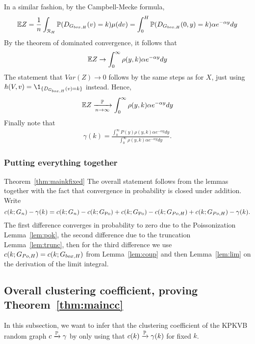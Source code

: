 In a similar fashion, by the Campbell-Mecke formula,
\begin{align*}
\mathbb{E} Z =\frac{1}{n} \int_{{\mathcal R}_H} \mathbb{P}(D_{G_{box,H}}(v)=k) \mu(dv) = \int_0^H \mathbb{P}(D_{G_{box,H}}(0,y)=k) \alpha e^{-\alpha y}dy
\end{align*}
By the theorem of dominated convergence, it follows that
\begin{align*}
\mathbb{E} Z \rightarrow \int_0^\infty \rho(y,k)\alpha e^{-\alpha y}dy
\end{align*}
The statement that $Var(Z) \rightarrow 0$ follows by the same steps as for $X$, just using $h(V,v) = \1_{\{D_{\GboxH}(v)=k\}}$ instead. Hence,
\begin{align*}
\mathbb{E} Z \xrightarrow[n\rightarrow\infty]{\mathbb{P}} \int_0^\infty \rho(y,k)\alpha e^{-\alpha y}dy
\end{align*}
Finally note that 
\begin{align*}
\gamma(k) = \frac{\int_0^\infty P(y)\rho(y,k)\alpha e^{-\alpha y}dy}{\int_0^\infty \rho(y,k)\alpha e^{-\alpha y}dy}.
\end{align*}

\subsubsection{Putting everything together}
\begin{proofof}{Theorem~\ref{thm:mainkfixed}}
The overall statement follows from the lemmas together with the fact that convergence in probability is closed under addition.
Write 
$$c(k;G_n)-\gamma(k) = c(k;G_n) - c(k;G_{\text{Po}})+c(k;G_{\text{Po}})-c(k;G_{Po,H})+c(k;G_{Po,H})-\gamma(k).$$ 
The first difference converges in probability to zero due to the Poissonization Lemma~\ref{lem:pok}, the second difference due to the truncation Lemma~\ref{lem:trunc}, then for the third difference we use $c(k;G_{Po,H})=c(k;G_{box,H})$ from Lemma~\ref{lem:coup} and then Lemma~\ref{lem:lim} on the derivation of the limit integral.
\end{proofof}

\subsection{Overall clustering coefficient, proving Theorem~\ref{thm:maincc}}
In this subsection, we want to infer that the clustering coefficient of the KPKVB random graph $c \xrightarrow{\mathbb{P}} \gamma$ by only using that $c(k) \xrightarrow{\mathbb{P}} \gamma(k)$ for fixed $k$.

